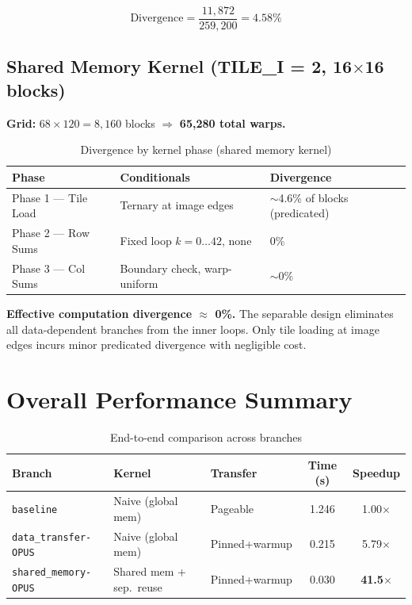 \documentclass[11pt]{article}
\begin{document}
\[
  \text{Divergence} = \frac{11{,}872}{259{,}200} = \mathbf{4.58\%}
\]

\subsection{Shared Memory Kernel (TILE\_I = 2, 16$\times$16 blocks)}

\noindent\textbf{Grid:} $68 \times 120 = 8{,}160$ blocks $\Rightarrow$
\textbf{65,280 total warps.}

\begin{table}[h]
\centering
\caption{Divergence by kernel phase (shared memory kernel)}
\smallskip
\begin{tabular}{l l l}
\toprule
\textbf{Phase} & \textbf{Conditionals} & \textbf{Divergence} \\
\midrule
Phase 1 --- Tile Load & Ternary at image edges & ${\sim}$4.6\% of blocks (predicated) \\
Phase 2 --- Row Sums  & Fixed loop $k = 0\ldots42$, none & 0\% \\
Phase 3 --- Col Sums  & Boundary check, warp-uniform & ${\sim}$0\% \\
\bottomrule
\end{tabular}
\end{table}

\textbf{Effective computation divergence $\approx$ 0\%.} The separable design
eliminates all data-dependent branches from the inner loops. Only tile loading at
image edges incurs minor predicated divergence with negligible cost.

\section{Overall Performance Summary}

\begin{table}[h]
\centering
\caption{End-to-end comparison across branches}
\smallskip
\begin{tabular}{l l l c c}
\toprule
\textbf{Branch} & \textbf{Kernel} & \textbf{Transfer} & \textbf{Time (s)} & \textbf{Speedup} \\
\midrule
\texttt{baseline}             & Naive (global mem)     & Pageable       & 1.246 & 1.00$\times$ \\
\texttt{data\_transfer-OPUS}  & Naive (global mem)     & Pinned+warmup  & 0.215 & 5.79$\times$ \\
\rowcolor{green!15}
\texttt{shared\_memory-OPUS}  & Shared mem + sep.\ reuse & Pinned+warmup & 0.030 & \textbf{41.5$\times$} \\
\bottomrule
\end{tabular}
\end{table}
\end{document}
